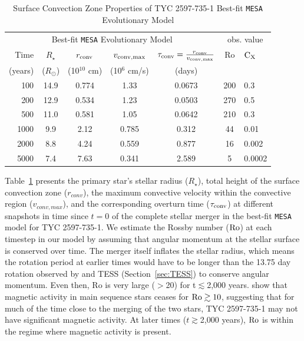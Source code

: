 \documentclass[linenumbers]{aastex631}
\begin{document}
\begin{table}

\caption{Surface Convection Zone Properties of TYC 2597-735-1 Best-fit \texttt{MESA} Evolutionary Model
	\label{tab:mesa}}
\begin{tabular}{r c c c c | c l}
\hline\hline
\multicolumn{5}{c|}{Best-fit \texttt{MESA} Evolutionary Model} & \multicolumn{2}{c}{obs. value} \\
Time & $R_{\star}$ & $r_{\rm conv}$ & $v_{\rm conv, max}$ & $\tau_{\rm conv} = \frac{r_{\rm conv}}{v_{\rm conv, max}}$ & Ro & ${\rm C_X}$ \\
(years)    &    ($R_{\odot}$)   & (10$^{10}$ cm)           & (10$^{6}$ cm/s)        & (days) \\
\hline
%
	100  & 14.9 & 0.774 & 1.33 & 0.0673 & 200 & 0.3  \\
	200  & 12.9 & 0.534 & 1.23 & 0.0503 & 270 & 0.5  \\
	500  & 11.0 & 0.581 & 1.05 & 0.0642 & 210 & 0.3  \\
	1000 & 9.9  & 2.12 & 0.785 & 0.312  & 44 & 0.01  \\
	2000 & 8.8  & 4.24 & 0.559 & 0.877  & 16  & 0.002\\
	5000 & 7.4  & 7.63 & 0.341 & 2.589  & 5   & 0.0002 \\
\hline
\end{tabular}
\end{table}


Table~\ref{tab:mesa} presents the primary star's stellar radius ($R_{\star}$), total height of the surface convection zone ($r_{conv}$), the maximum convective velocity within the convective region ($v_{conv,max}$), and the corresponding overturn time ($\tau_{\rm conv}$) at different snapshots in time since $t=0$ of the complete stellar merger in the \citet{2020Natur.587..387H} best-fit \texttt{MESA} model for TYC 2597-735-1.
We estimate the Rossby number (${\rm Ro}$) at each timestep in our model by assuming that angular momentum at the stellar surface is conserved over time. The merger itself inflates the stellar radius, which means the rotation period at earlier times would have to be longer than the 13.75 day rotation observed by \citet{2020Natur.587..387H} and TESS (Section~\ref{sec:TESS}) to conserve angular momentum. Even then, Ro is very large ($>$20) for t$\lesssim$2,000 years.  \citet{Pizzolato+2003} show that magnetic activity in main sequence stars ceases for ${\rm Ro} \gtrsim 10$, suggesting that for much of the time close to the merging of the two stars, TYC 2597-735-1 may not have significant magnetic activity.
At later times ($t\gtrsim$2,000 years), ${\rm Ro}$ is within the regime where magnetic activity is present.
\end{document}
